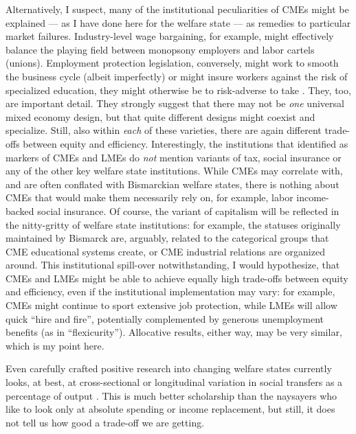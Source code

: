 \begin{enumerate}
{		Alternatively, I suspect, many of the institutional peculiarities of \glspl{CME} might be explained --- as I have done here for the welfare state --- as remedies to particular market failures.
		Industry-level wage bargaining, for example, might effectively balance the playing field between monopsony employers and labor cartels (unions).
		Employment protection legislation, conversely, might work to smooth the business cycle (albeit imperfectly) or might insure workers against the risk of specialized education, they might otherwise be to risk-adverse to take \citep[for example,][444]{Offe2003}.
	}
	They, too, are important detail.
	They strongly suggest that there may not be \emph{one} universal mixed economy design, but that quite different designs might coexist and specialize.
	Still, also within \emph{each} of these varieties, there are again different trade-offs between equity and efficiency.
Interestingly, the institutions that \citeauthor{HallSoskice-2001-aa} identified as markers of \glspl{CME} and \glspl{LME} do \emph{not} mention variants of tax, social insurance or any of the other key welfare state institutions.
While \glspl{CME} may correlate with, and are often conflated with Bismarckian welfare states, there is nothing about \glspl{CME} that would make them necessarily rely on, for example, labor income-backed social insurance.
Of course, the variant of capitalism will be reflected in the nitty-gritty of welfare state institutions:
for example, the statuses originally maintained by Bismarck are, arguably, related to the categorical groups that \gls{CME} educational systems create, or \gls{CME} industrial relations are organized around.
This institutional spill-over notwithstanding, I would hypothesize, that \glspl{CME} and \glspl{LME} might be able to achieve equally high trade-offs between equity and efficiency, even if the institutional implementation may vary:
for example, \glspl{CME} might continue to sport extensive job protection, while \glspl{LME} will allow quick ``hire and fire'', potentially complemented by generous unemployment benefits (as in ``flexicurity'').
Allocative results, either way, may be very similar, which is my point here.

	Even carefully crafted positive research into changing welfare states currently looks, at best, at cross-sectional or longitudinal variation in social transfers as a percentage of output \citep[for example,][249]{Ravenhill2005}.
This is much better scholarship than the naysayers who like to look only at absolute spending or income replacement, but still, it does not tell us how good a trade-off we are getting.


\end{enumerate}
